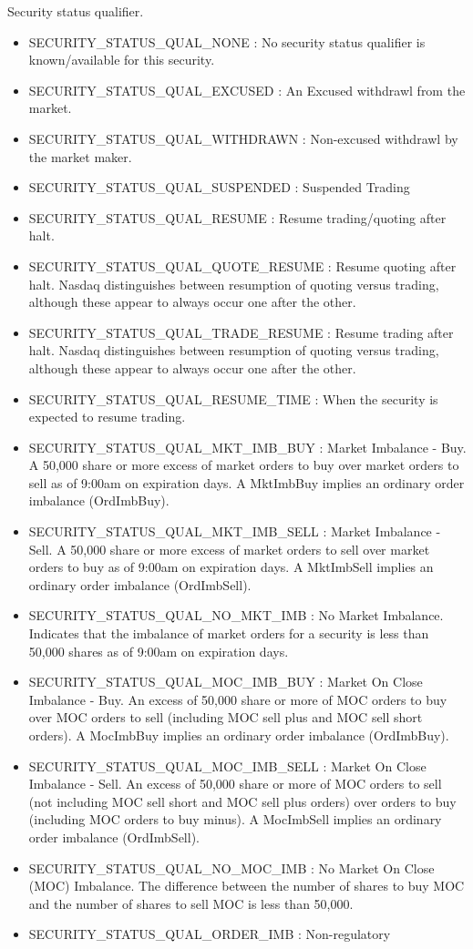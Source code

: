 Security status qualifier. 

\begin{itemize}
\item SECURITY\_\-STATUS\_\-QUAL\_\-NONE : No security status qualifier is known/available for this security. \item SECURITY\_\-STATUS\_\-QUAL\_\-EXCUSED : An Excused withdrawl from the market. \item SECURITY\_\-STATUS\_\-QUAL\_\-WITHDRAWN : Non-excused withdrawl by the market maker. \item SECURITY\_\-STATUS\_\-QUAL\_\-SUSPENDED : Suspended Trading \item SECURITY\_\-STATUS\_\-QUAL\_\-RESUME : Resume trading/quoting after halt. \item SECURITY\_\-STATUS\_\-QUAL\_\-QUOTE\_\-RESUME : Resume quoting after halt. Nasdaq distinguishes between resumption of quoting versus trading, although these appear to always occur one after the other. \item SECURITY\_\-STATUS\_\-QUAL\_\-TRADE\_\-RESUME : Resume trading after halt. Nasdaq distinguishes between resumption of quoting versus trading, although these appear to always occur one after the other. \item SECURITY\_\-STATUS\_\-QUAL\_\-RESUME\_\-TIME : When the security is expected to resume trading. \item SECURITY\_\-STATUS\_\-QUAL\_\-MKT\_\-IMB\_\-BUY : Market Imbalance - Buy. A 50,000 share or more excess of market orders to buy over market orders to sell as of 9:00am on expiration days. A Mkt\-Imb\-Buy implies an ordinary order imbalance (Ord\-Imb\-Buy). \item SECURITY\_\-STATUS\_\-QUAL\_\-MKT\_\-IMB\_\-SELL : Market Imbalance - Sell. A 50,000 share or more excess of market orders to sell over market orders to buy as of 9:00am on expiration days. A Mkt\-Imb\-Sell implies an ordinary order imbalance (Ord\-Imb\-Sell). \item SECURITY\_\-STATUS\_\-QUAL\_\-NO\_\-MKT\_\-IMB : No Market Imbalance. Indicates that the imbalance of market orders for a security is less than 50,000 shares as of 9:00am on expiration days. \item SECURITY\_\-STATUS\_\-QUAL\_\-MOC\_\-IMB\_\-BUY : Market On Close Imbalance - Buy. An excess of 50,000 share or more of MOC orders to buy over MOC orders to sell (including MOC sell plus and MOC sell short orders). A Moc\-Imb\-Buy implies an ordinary order imbalance (Ord\-Imb\-Buy). \item SECURITY\_\-STATUS\_\-QUAL\_\-MOC\_\-IMB\_\-SELL : Market On Close Imbalance - Sell. An excess of 50,000 share or more of MOC orders to sell (not including MOC sell short and MOC sell plus orders) over orders to buy (including MOC orders to buy minus). A Moc\-Imb\-Sell implies an ordinary order imbalance (Ord\-Imb\-Sell). \item SECURITY\_\-STATUS\_\-QUAL\_\-NO\_\-MOC\_\-IMB : No Market On Close (MOC) Imbalance. The difference between the number of shares to buy MOC and the number of shares to sell MOC is less than 50,000. \item SECURITY\_\-STATUS\_\-QUAL\_\-ORDER\_\-IMB : Non-regulatory 
\end{itemize}

